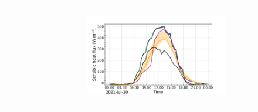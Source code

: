 \begin{figure}[hbtp]
\begin{tabular}{cc}
\begin{subfigure}[t]{0.5\textwidth}
        \end{subfigure} &
        \begin{subfigure}[t]{0.5\textwidth}
            \caption{}
            \includegraphics[width=\textwidth]{images/chap5/IOP_TS/TS_2021-07-20_elsplans_sens.png}
        \end{subfigure} \\
    \end{tabular}
    \caption{}
    \label{fig:iop_days_TS_energy_elsplans}
\end{figure}

